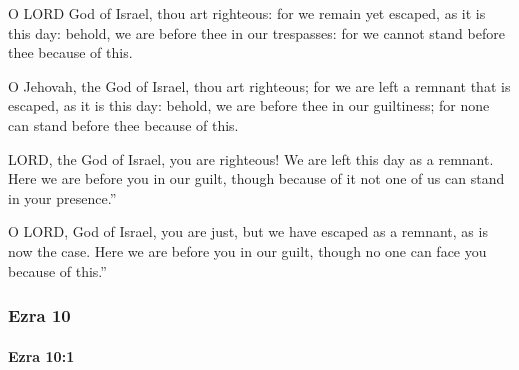 			O LORD God of Israel, thou art righteous: for we remain yet escaped, as it is this day: behold, we are before thee in our trespasses: for we cannot stand before thee because of this.

			\begin{versebox}
					\item[BHS] 
					\item[LXX] 
					\item[ASV] O Jehovah, the God of Israel, thou art righteous; for we are left a remnant that is escaped, as it is this day: behold, we are before thee in our guiltiness; for none can stand before thee because of this.
					\item[NIV] LORD, the God of Israel, you are righteous! We are left this day as a remnant. Here we are before you in our guilt, though because of it not one of us can stand in your presence.”
					\item[NRSV] O LORD, God of Israel, you are just, but we have escaped as a remnant, as is now the case. Here we are before you in our guilt, though no one can face you because of this.”
			\end{versebox}
	\subsubsection{Ezra 10} %
		\label{EZRA-10}

		\paragraph{Ezra 10:1} %
			\label{EZRA-10-1}

